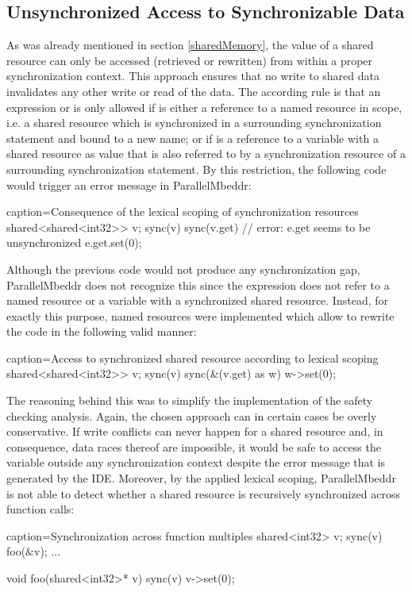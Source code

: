 \subsection{Unsynchronized Access to Synchronizable Data}
As was already mentioned in section \ref*{sharedMemory}, the value of a shared resource can only be accessed (retrieved or rewritten) from within a proper synchronization context. This approach ensures that no write to shared data invalidates any other write or read of the data. The according rule is that an expression  or  is only allowed if  is either a reference to a named resource in scope, i.e. a shared resource which is synchronized in a surrounding synchronization statement and bound to a new name; or if  is a reference to a variable with a shared resource as value that is also referred to by a synchronization resource of a surrounding synchronization statement. By this restriction, the following code would trigger an error message in ParallelMbeddr:
\begin{ccode}{caption=Consequence of the lexical scoping of synchronization resources}
shared<shared<int32>> v;
sync(v) {
  sync(v.get) {
    // error: e.get seems to be unsynchronized
    e.get.set(0);
  }
}
\end{ccode}
Although the previous code would not produce any synchronization gap, ParallelMbeddr does not recognize this since the expression  does not refer to a named resource or a variable with a synchronized shared resource. Instead, for exactly this purpose, named resources were implemented which allow to rewrite the code in the following valid manner:
\begin{ccode}{caption=Access to synchronized shared resource according to lexical scoping}
shared<shared<int32>> v;
sync(v) {
  sync(&(v.get) as w) {
    w->set(0);
  }
}
\end{ccode}
The reasoning behind this was to simplify the implementation of the safety checking analysis. Again, the chosen approach can in certain cases be overly conservative. If write conflicts can never happen for a shared resource and, in consequence, data races thereof are impossible, it would be safe to access the variable outside any synchronization context despite the error message that is generated by the IDE. Moreover, by the applied lexical scoping, ParallelMbeddr is not able to detect whether a shared resource is recursively synchronized across function calls:
\begin{ccode}{caption=Synchronization across function multiples}
  shared<int32> v;
  sync(v) { foo(&v); }
  ...

void foo(shared<int32>* v) {
  sync(v) { v->set(0); }
}
\end{ccode}

